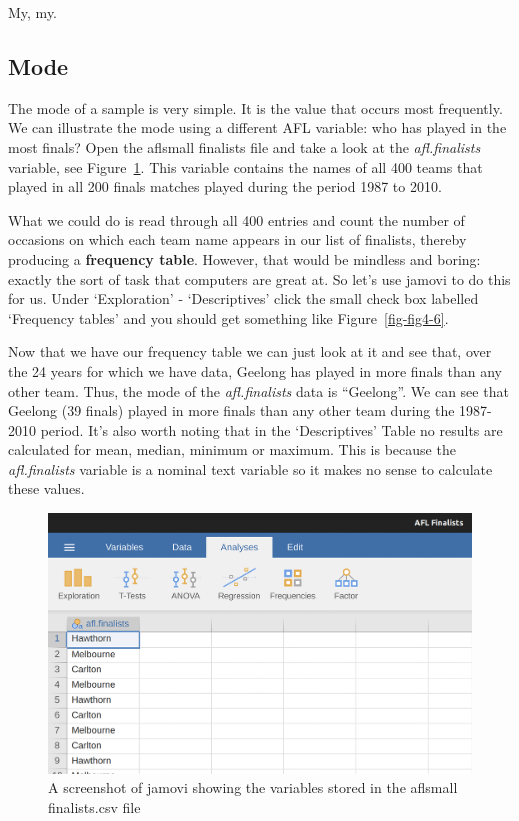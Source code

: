 \documentclass[
  a4paper,
]{book}
\begin{document}
My, my.

\hypertarget{sec-Mode}{%
\subsection{Mode}\label{sec-Mode}}

The mode of a sample is very simple. It is the value that occurs most
frequently. We can illustrate the mode using a different AFL variable:
who has played in the most finals? Open the aflsmall finalists file and
take a look at the \emph{afl.finalists} variable, see
Figure~\ref{fig-fig4-5}. This variable contains the names of all 400
teams that played in all 200 finals matches played during the period
1987 to 2010.

What we could do is read through all 400 entries and count the number of
occasions on which each team name appears in our list of finalists,
thereby producing a \textbf{frequency table}. However, that would be
mindless and boring: exactly the sort of task that computers are great
at. So let's use jamovi to do this for us. Under `Exploration' -
`Descriptives' click the small check box labelled `Frequency tables' and
you should get something like Figure~\ref{fig-fig4-6}.

Now that we have our frequency table we can just look at it and see
that, over the 24 years for which we have data, Geelong has played in
more finals than any other team. Thus, the mode of the
\emph{afl.finalists} data is ``Geelong''. We can see that Geelong (39
finals) played in more finals than any other team during the 1987-2010
period. It's also worth noting that in the `Descriptives' Table no
results are calculated for mean, median, minimum or maximum. This is
because the \emph{afl.finalists} variable is a nominal text variable so
it makes no sense to calculate these values.

\begin{figure}

\includegraphics[width=1\textwidth,height=\textheight]{images/fig4-5.png} \hfill{}

\caption{\label{fig-fig4-5}A screenshot of jamovi showing the variables
stored in the aflsmall finalists.csv file}

\end{figure}
\end{document}
